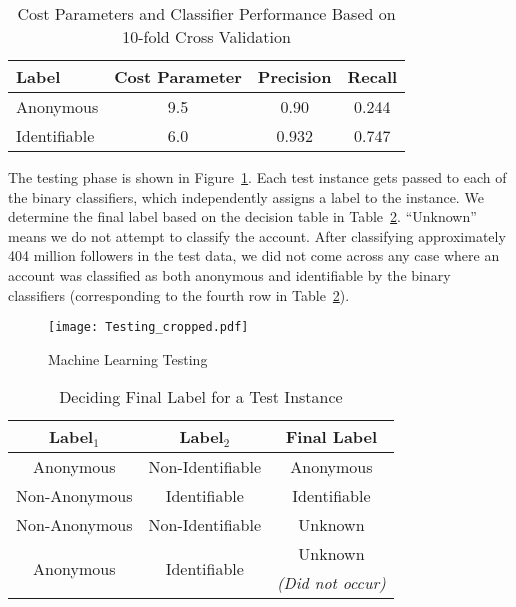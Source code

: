 \documentclass[conference]{IEEEtran}
\begin{document}
\begin{table}[thbp]
\small
\begin{center}
\caption{Cost Parameters and Classifier Performance Based on 10-fold Cross Validation}
\label{tab:precisionrecall}
\begin{tabular}{| l | c | c | c |}
\hline
\textbf{Label} & \textbf{Cost Parameter} & \textbf{Precision} & \textbf{Recall}\\
\hline
Anonymous & 9.5 & 0.90  & 0.244\\
\hline
Identifiable & 6.0 & 0.932 & 0.747\\
\hline  
\end{tabular}
\end{center}
\end{table}


The testing phase is shown in Figure~\ref{fig:testing}. Each test instance gets passed to each of the binary classifiers, which independently assigns a label to the instance. We determine the final label based on the decision table in Table~\ref{tab:labeldecision}. ``Unknown'' means we do not attempt to classify the account. After classifying approximately 404 million followers in the test data, we did not come across any case where an account was classified as both anonymous and identifiable by the binary classifiers (corresponding to the fourth row in Table~\ref{tab:labeldecision}).

\begin{figure}[thbp]
\begin{center}
  \centering
  \caption{Machine Learning Testing}
  \label{fig:testing}
     \texttt{[image: Testing\_cropped.pdf]}
\end{center}
\end{figure}

\begin{table}[thbp]
\small
\begin{center}
\caption{Deciding Final Label for a Test Instance}
\label{tab:labeldecision}
\begin{tabular}{| c | c | c |}
\hline
\textbf{Label$_{1}$} & \textbf{Label$_{2}$} & \textbf{Final Label}\\
\hline
Anonymous & Non-Identifiable & Anonymous \\
\hline
Non-Anonymous & Identifiable & Identifiable \\
\hline
Non-Anonymous & Non-Identifiable & Unknown \\
\hline
\multirow{2}{*}{Anonymous} & \multirow{2}{*}{Identifiable} & Unknown \\
& & \textit{(Did not occur)} \\
\hline  
\end{tabular}
\end{center}
\end{table}
\end{document}
